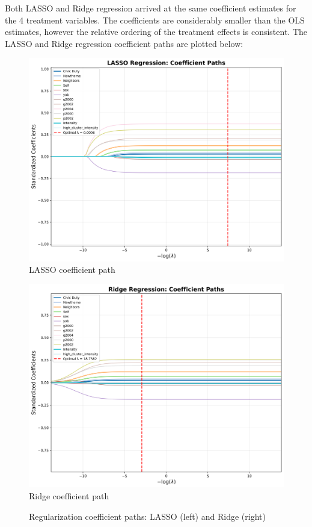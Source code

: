 \documentclass[11pt, draft]{article}
\begin{document}
Both LASSO and Ridge regression arrived at the same coefficient estimates for the 4 treatment variables. The coefficients are considerably smaller than the OLS estimates, however the relative ordering of the treatment effects is consistent. The LASSO and Ridge regression coefficient paths are plotted below:
\begin{figure}[H]
    \centering
    \begin{minipage}[t]{0.48\textwidth}
        \centering
        \includegraphics[width=\linewidth]{../Output/Plots/lasso_coefficients.png}
        \vspace{0.3em}
        {\small LASSO coefficient path}
    \end{minipage}
    \hfill
    \begin{minipage}[t]{0.48\textwidth}
        \centering
        \includegraphics[width=\linewidth]{../Output/Plots/ridge_coefficients.png}
        \vspace{0.3em}
        {\small Ridge coefficient path}
    \end{minipage}
    \caption{Regularization coefficient paths: LASSO (left) and Ridge (right)}
    \label{fig:coef_paths}
\end{figure}
\end{document}
